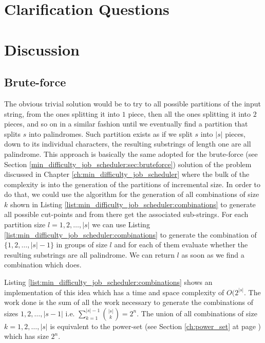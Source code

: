\section{Clarification Questions}

\begin{QandA}
	\item 
	\begin{answered}
		\textit{}
	\end{answered}
	
\end{QandA}

\section{Discussion}
\label{palindrome_partitioning2:sec:discussion}


\subsection{Brute-force}
\label{palindrome_partitioning2:sec:bruteforce}
The obvious trivial solution would be to try to all possible partitions of the input string, from
the ones splitting it into $1$ piece, then all the ones splitting it into $2$ pieces, and so on in a
similar fashion until we eventually find a partition that splits $s$ into palindromes. Such
partition exists as if we split $s$ into $|s|$ pieces, down to its individual characters, the
resulting substrings of length one are all palindrome. This approach is basically the same adopted
for the brute-force (see Section \ref{min_difficulty_job_scheduler:sec:bruteforce}) solution of the
problem discussed in Chapter \ref{ch:min_difficulty_job_scheduler} where the bulk of the complexity
is into the generation of the partitions of incremental size. In order to do that, we could use the
algorithm for the generation of all combinations of size $k$ shown in Listing
\ref{list:min_difficulty_job_scheduler:combinations} to generate all possible cut-points and from
there get the associated sub-strings. For each partition size $l = 1,2,\ldots,|s|$ we can use
Listing \ref{list:min_difficulty_job_scheduler:combinations} to generate the combination of
$\{1,2,\ldots,|s|-1\}$ in groups of size $l$ and for each of them evaluate whether the resulting
substrings are all palindrome. We can return $l$ as soon as we find a combination which does.

Listing \ref{list:min_difficulty_job_scheduler:combinations} shows an implementation of this idea
which has a time and space complexity of $O(2^{|s|}$. The work done is the sum of all the work
necessary to generate the combinations of sizes $1,2,\ldots,|s-1|$ i.e. $\sum_{k=1}^{|s|-1} {|s|
\choose k} = 2^n$. The union of all combinations of size $k=1,2,\ldots,|s|$ is equivalent to the
power-set (see Section \ref{ch:power_set} at page \pageref{sec:powerset:discussion}) which has size
$2^n$.

